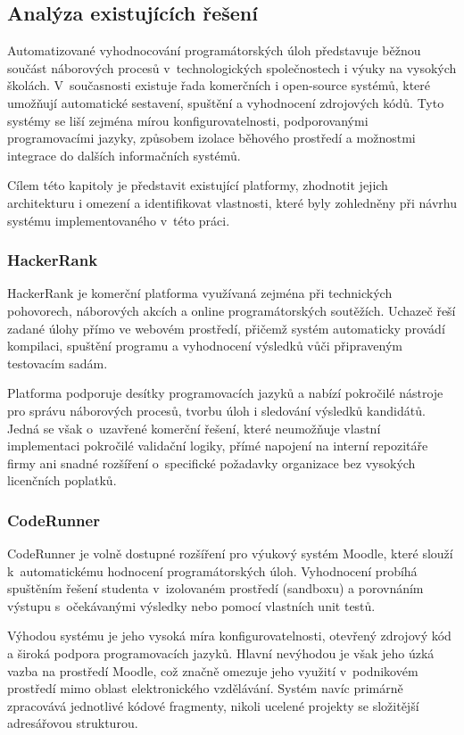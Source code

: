 \documentclass[
  biblatex,
  figures,
  tables,
  glossaries,
  index
]{kidiplom}
\begin{document}
\subsection{Analýza existujících řešení}
Automatizované vyhodnocování programátorských úloh představuje běžnou součást náborových procesů v~technologických společnostech i výuky na vysokých školách. V~současnosti existuje řada komerčních i open-source systémů, které umožňují automatické sestavení, spuštění a vyhodnocení zdrojových kódů. Tyto systémy se liší zejména mírou konfigurovatelnosti, podporovanými programovacími jazyky, způsobem izolace běhového prostředí a možnostmi integrace do dalších informačních systémů.

Cílem této kapitoly je představit existující platformy, zhodnotit jejich architekturu i omezení a identifikovat vlastnosti, které byly zohledněny při návrhu systému implementovaného v~této práci.


\subsubsection{HackerRank}
HackerRank je komerční platforma využívaná zejména při technických pohovorech, náborových akcích a online programátorských soutěžích. Uchazeč řeší zadané úlohy přímo ve webovém prostředí, přičemž systém automaticky provádí kompilaci, spuštění programu a vyhodnocení výsledků vůči připraveným testovacím sadám.~\cite{hackerrank}

Platforma podporuje desítky programovacích jazyků a nabízí pokročilé nástroje pro správu náborových procesů, tvorbu úloh i sledování výsledků kandidátů. Jedná se však o~uzavřené komerční řešení, které neumožňuje vlastní implementaci pokročilé validační logiky, přímé napojení na interní repozitáře firmy ani snadné rozšíření o~specifické požadavky organizace bez vysokých licenčních poplatků.


\subsubsection{CodeRunner}
CodeRunner je volně dostupné rozšíření pro výukový systém Moodle, které slouží k~automatickému hodnocení programátorských úloh. Vyhodnocení probíhá spuštěním řešení studenta v~izolovaném prostředí (sandboxu) a porovnáním výstupu s~očekávanými výsledky nebo pomocí vlastních unit testů.~\cite{coderunner}

Výhodou systému je jeho vysoká míra konfigurovatelnosti, otevřený zdrojový kód a široká podpora programovacích jazyků. Hlavní nevýhodou je však jeho úzká vazba na prostředí Moodle, což značně omezuje jeho využití v~podnikovém prostředí mimo oblast elektronického vzdělávání. Systém navíc primárně zpracovává jednotlivé kódové fragmenty, nikoli ucelené projekty se složitější adresářovou strukturou.
\end{document}
